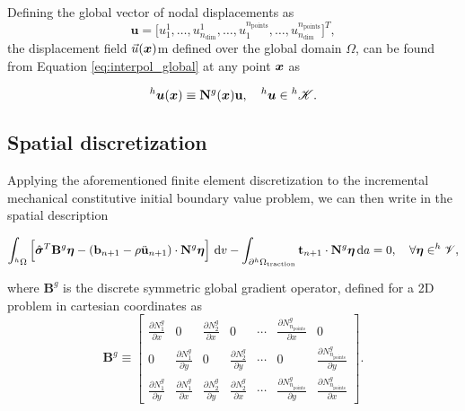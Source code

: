 Defining the global vector of nodal displacements as
\begin{equation}
    \mathbf u = \Big[ u_1^1,\dots,u^1_{n_\text{dim}},\dots, u_1^{n_\text{points}},\dots,u^{n_\text{points}}_{n_\text{dim}}\Big]^T,
\end{equation}
the displacement field $\vec u(\bm{x})$m defined over the global domain $\Omega$, can be found from Equation \eqref{eq:interpol_global} at any point $\bm{x}$ as
\begin{highlight}
    \begin{equation}
        ^h\bm{u}(\bm{x}) \equiv \mathbf N^g(\bm{x})\mathbf u,\quad ^h\bm{u}\in {}^h\mathscr{K}.
    \end{equation}
\end{highlight}

\subsection{Spatial discretization} \label{sec:spatial_discretization}

Applying the aforementioned finite element discretization to the incremental mechanical constitutive initial boundary value problem, we can then write in the spatial description
\begin{highlight}
    \begin{equation}
        \int_{^h\Omega}\left[\hat{\bm{\sigma}}^T\mathbf B^g\bm{\eta} - (\mathbf b_{n+1} - \rho\ddot{\mathbf u}_{n+1}) \cdot \mathbf N^g \bm{\eta} \right]\,\mathrm{d} v -\int_{\partial ^h\Omega_\text{traction}} \mathbf t_{n+1}\cdot \mathbf N^g\bm{\eta} \,\mathrm{d} a = 0,\quad \forall \bm{\eta} \in ^h\mathscr{V},  \label{eq:forma_fraca_disc}
    \end{equation}
\end{highlight}
where $\mathbf B^g$ is the discrete symmetric global gradient operator, defined for a 2D problem in cartesian coordinates as
\begin{equation}
    \mathbf B^g\equiv \left[
    \begin{array}{ccccccc}
         \displaystyle{\frac{\partial N_1^g}{\partial x}} & 0 & \displaystyle{\frac{\partial N_2^g}{\partial x}} & 0 & \cdots &
         \displaystyle{\frac{\partial N_{n_\text{points}}^g}{\partial x}} & 0\\
         0 & \displaystyle{\frac{\partial N_1^g}{\partial y}} & 0 & \displaystyle{\frac{\partial N_2^g}{\partial y}} & \cdots &
         0 & \displaystyle{\frac{\partial N_{n_\text{points}}^g}{\partial y}}\\
         \displaystyle{\frac{\partial N_1^g}{\partial y}} & \displaystyle{\frac{\partial N_1^g}{\partial x}} & \displaystyle{\frac{\partial N_2^g}{\partial y}} & \displaystyle{\frac{\partial N_2^g}{\partial x}} & \cdots &
         \displaystyle{\frac{\partial N_{n_\text{points}}^g}{\partial y}} & \displaystyle{\frac{\partial N_{n_\text{points}}^g}{\partial x}}
    \end{array}
    \right].
\end{equation}

